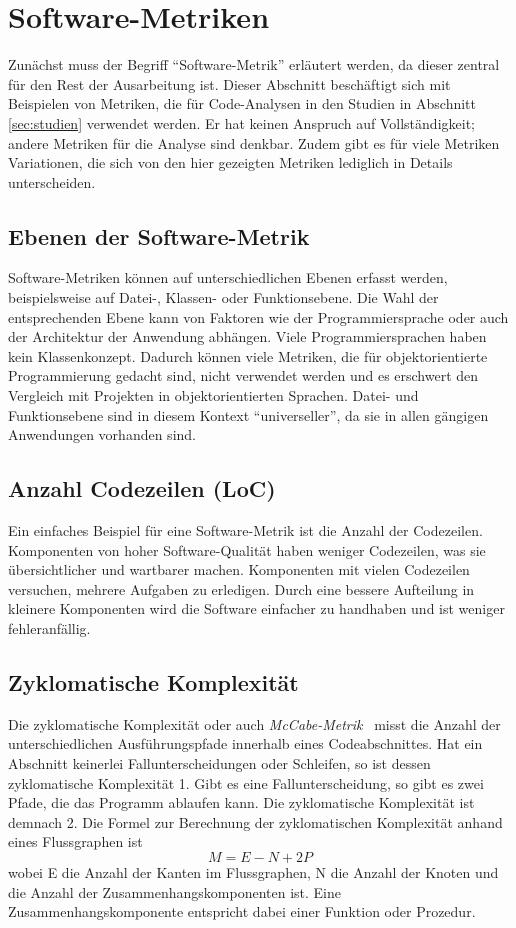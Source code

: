 \section{Software-Metriken}
\label{sec:metriken}
Zunächst muss der Begriff "`Software-Metrik"' erläutert werden, da dieser zentral für den Rest der Ausarbeitung ist.
Dieser Abschnitt beschäftigt sich mit Beispielen von Metriken, die für Code-Analysen in den Studien in Abschnitt \ref{sec:studien} verwendet werden.
Er hat keinen Anspruch auf Vollständigkeit; andere Metriken für die Analyse sind denkbar.
Zudem gibt es für viele Metriken Variationen, die sich von den hier gezeigten Metriken lediglich in Details unterscheiden.

\subsection{Ebenen der Software-Metrik}
Software-Metriken können auf unterschiedlichen Ebenen erfasst werden, beispielsweise auf Datei-, Klassen- oder Funktionsebene.
Die Wahl der entsprechenden Ebene kann von Faktoren wie der Programmiersprache oder auch der Architektur der Anwendung abhängen.
Viele Programmiersprachen haben kein Klassenkonzept.
Dadurch können viele Metriken, die für objektorientierte Programmierung gedacht sind, nicht verwendet werden und es erschwert den Vergleich mit Projekten in objektorientierten Sprachen.
Datei- und Funktionsebene sind in diesem Kontext "`universeller"', da sie in allen gängigen Anwendungen vorhanden sind.

\subsection{Anzahl Codezeilen (LoC)}
Ein einfaches Beispiel für eine Software-Metrik ist die Anzahl der Codezeilen.
Komponenten von hoher Software-Qualität haben weniger Codezeilen, was sie übersichtlicher und wartbarer machen.
Komponenten mit vielen Codezeilen versuchen, mehrere Aufgaben zu erledigen.
Durch eine bessere Aufteilung in kleinere Komponenten wird die Software einfacher zu handhaben und ist weniger fehleranfällig.

\subsection{Zyklomatische Komplexität}
Die zyklomatische Komplexität oder auch \emph{McCabe-Metrik}~\cite{mccabe1976} misst die Anzahl der unterschiedlichen Ausführungspfade innerhalb eines Codeabschnittes.
Hat ein Abschnitt keinerlei Fallunterscheidungen oder Schleifen, so ist dessen zyklomatische Komplexität 1.
Gibt es eine Fallunterscheidung, so gibt es zwei Pfade, die das Programm ablaufen kann.
Die zyklomatische Komplexität ist demnach 2.
Die Formel zur Berechnung der zyklomatischen Komplexität anhand eines Flussgraphen ist
\begin{equation}
	M = E - N + 2P
\end{equation}
wobei E die Anzahl der Kanten im Flussgraphen, N die Anzahl der Knoten und die Anzahl der Zusammenhangskomponenten ist.
Eine Zusammenhangskomponente entspricht dabei einer Funktion oder Prozedur.

